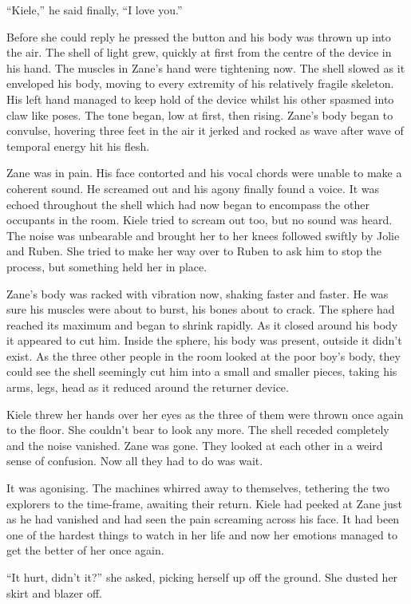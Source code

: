 ``Kiele,'' he said finally, ``I love you.''

Before she could reply he pressed the button and his body was thrown up into the air.  The shell of light grew, quickly at first from the centre of the device in his hand.  The muscles in Zane's hand were tightening now.  The shell slowed as it enveloped his body, moving to every extremity of his relatively fragile skeleton.  His left hand managed to keep hold of the device whilst his other spasmed into claw like poses.  The tone began, low at first, then rising.  Zane's body began to convulse, hovering three feet in the air it jerked and rocked as wave after wave of temporal energy hit his flesh.

Zane was in pain.  His face contorted and his vocal chords were unable to make a coherent sound.  He screamed out and his agony finally found a voice.  It was echoed throughout the shell which had now began to encompass the other occupants in the room.  Kiele tried to scream out too, but no sound was heard.  The noise was unbearable and brought her to her knees followed swiftly by Jolie and Ruben.  She tried to make her way over to Ruben to ask him to stop the process, but something held her in place.

Zane's body was racked with vibration now, shaking faster and faster.  He was sure his muscles were about to burst, his bones about to crack.  The sphere had reached its maximum and began to shrink rapidly.  As it closed around his body it appeared to cut him.  Inside the sphere, his body was present, outside it didn't exist.  As the three other people in the room looked at the poor boy's body, they could see the shell seemingly cut him into a small and smaller pieces, taking his arms, legs, head as it reduced around the returner device.

Kiele threw her hands over her eyes as the three of them were thrown once again to the floor.  She couldn't bear to look any more.  The shell receded completely and the noise vanished.  Zane was gone.  They looked at each other in a weird sense of confusion.  Now all they had to do was wait.

It was agonising.  The machines whirred away to themselves, tethering the two explorers to the time-frame, awaiting their return.  Kiele had peeked at Zane just as he had vanished and had seen the pain screaming across his face.  It had been one of the hardest things to watch in her life and now her emotions managed to get the better of her once again.

``It hurt, didn't it?'' she asked, picking herself up off the ground.  She dusted her skirt and blazer off.

